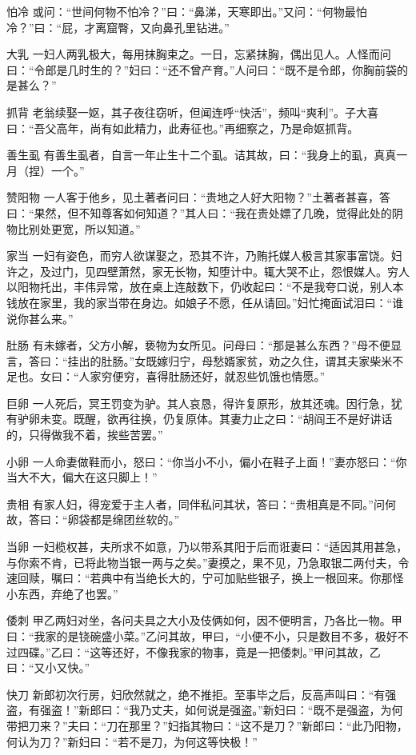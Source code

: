 \documentclass[12pt,UTF8]{ctexbook}
\begin{document}
怕冷
或问：“世间何物不怕冷？”曰：“鼻涕，天寒即出。”又问：“何物最怕冷？”曰：“屁，才离窟臀，又向鼻孔里钻进。”

大乳
一妇人两乳极大，每用抹胸束之。一日，忘紧抹胸，偶出见人。人怪而问曰：“令郎是几时生的？”妇曰：“还不曾产育。”人问曰：“既不是令郎，你胸前袋的是甚么？”

抓背
老翁续娶一妪，其子夜往窃听，但闻连呼“快活”，频叫“爽利”。子大喜曰：“吾父高年，尚有如此精力，此寿征也。”再细察之，乃是命妪抓背。

善生虱
有善生虱者，自言一年止生十二个虱。诘其故，曰：“我身上的虱，真真一月（捏）一个。”

赞阳物
一人客于他乡，见土著者问曰：“贵地之人好大阳物？”土著者甚喜，答曰：“果然，但不知尊客如何知道？”其人曰：“我在贵处嫖了几晚，觉得此处的阴物比别处更宽，所以知道。”

家当
一妇有姿色，而穷人欲谋娶之，恐其不许，乃贿托媒人极言其家事富饶。妇许之，及过门，见四壁萧然，家无长物，知堕计中。辄大哭不止，怨恨媒人。穷人以阳物托出，丰伟异常，放在桌上连敲数下，仍收起曰：“不是我夸口说，别人本钱放在家里，我的家当带在身边。如娘子不愿，任从请回。”妇忙掩面试泪曰：“谁说你甚么来。”

肚肠
有未嫁者，父方小解，亵物为女所见。问母曰：“那是甚么东西？”母不便显言，答曰：“挂出的肚肠。”女既嫁归宁，母愁婿家贫，劝之久住，谓其夫家柴米不足也。女曰：“人家穷便穷，喜得肚肠还好，就忍些饥饿也情愿。”

巨卵
一人死后，冥王罚变为驴。其人哀恳，得许复原形，放其还魂。因行急，犹有驴卵未变。既醒，欲再往换，仍复原体。其妻力止之曰：“胡阎王不是好讲话的，只得做我不着，挨些苦罢。”

小卵
一人命妻做鞋而小，怒曰：“你当小不小，偏小在鞋子上面！”妻亦怒曰：“你当大不大，偏大在这只脚上！”

贵相
有家人妇，得宠爱于主人者，同伴私问其状，答曰：“贵相真是不同。”问何故，答曰：“卵袋都是绵团丝软的。”

当卵
一妇榄权甚，夫所求不如意，乃以带系其阳于后而诳妻曰：“适因其用甚急，与你索不肯，已将此物当银一两与之矣。”妻摸之，果不见，乃急取银二两付夫，令速回赎，嘱曰：“若典中有当绝长大的，宁可加贴些银子，换上一根回来。你那怪小东西，弃绝了也罢。”

倭刺
甲乙两妇对坐，各问夫具之大小及伎俩如何，因不便明言，乃各比一物。甲曰：“我家的是铙碗盛小菜。”乙问其故，甲曰，“小便不小，只是数目不多，极好不过四碟。”乙曰：“这等还好，不像我家的物事，竟是一把倭刺。”甲问其故，乙曰：“又小又快。”

快刀
新郎初次行房，妇欣然就之，绝不推拒。至事毕之后，反高声叫曰：“有强盗，有强盗！”新郎曰：“我乃丈夫，如何说是强盗。”新妇曰：“既不是强盗，为何带把刀来？”夫曰：“刀在那里？”妇指其物曰：“这不是刀？”新郎曰：“此乃阳物，何认为刀？”新妇曰：“若不是刀，为何这等快极！”
\end{document}

